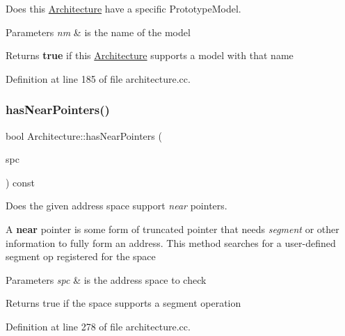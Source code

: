 Does this \mbox{\hyperlink{class_architecture}{Architecture}} have a specific Prototype\+Model. 


\begin{DoxyParams}{Parameters}
{\em nm} & is the name of the model \\
\hline
\end{DoxyParams}
\begin{DoxyReturn}{Returns}
{\bfseries{true}} if this \mbox{\hyperlink{class_architecture}{Architecture}} supports a model with that name 
\end{DoxyReturn}


Definition at line 185 of file architecture.\+cc.

\mbox{\label{class_architecture_a70c9e30f83ab8aba74049198f802baa7}} 
\subsubsection{\texorpdfstring{hasNearPointers()}{hasNearPointers()}}
{\footnotesize\ttfamily bool Architecture\+::has\+Near\+Pointers (\begin{DoxyParamCaption}\item[{\mbox{\hyperlink{class_addr_space}{Addr\+Space}} $\ast$}]{spc }\end{DoxyParamCaption}) const}



Does the given address space support {\itshape near} pointers. 

A {\bfseries{near}} pointer is some form of truncated pointer that needs {\itshape segment} or other information to fully form an address. This method searches for a user-\/defined segment op registered for the space 
\begin{DoxyParams}{Parameters}
{\em spc} & is the address space to check \\
\hline
\end{DoxyParams}
\begin{DoxyReturn}{Returns}
true if the space supports a segment operation 
\end{DoxyReturn}


Definition at line 278 of file architecture.\+cc.

